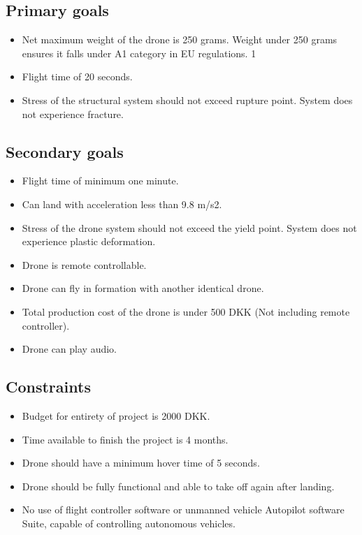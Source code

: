 \documentclass{article}
\begin{document}
\subsection{Primary goals }
\begin{itemize}
    \item 
    Net maximum weight of the drone is 250 grams. Weight under 250 grams ensures it falls under A1 category in EU regulations. 1 
    \item
    Flight time of 20 seconds.
    \item
    Stress of the structural system should not exceed rupture point. System does not experience fracture. 
\end{itemize}


\subsection{Secondary goals}
\begin{itemize}
    \item 
    Flight time of minimum one minute. 
    \item
    Can land with acceleration less than 9.8 m/s2.
    \item
    Stress of the drone system should not exceed the yield point. System does not experience plastic deformation. 
    \item
    Drone is remote controllable. 
    \item
    Drone can fly in formation with another identical drone.
    \item
    Total production cost of the drone is under 500 DKK (Not including remote controller). 
    \item
    Drone can play audio.
\end{itemize}


 
\subsection{Constraints}

\begin{itemize}
    \item 
    Budget for entirety of project is 2000 DKK.  
    \item
    Time available to finish the project is 4 months.
    \item
    Drone should have a minimum hover time of 5 seconds. 
    \item
    Drone should be fully functional and able to take off again after landing.
    \item
    No use of flight controller software or unmanned vehicle Autopilot software Suite, capable of controlling autonomous vehicles. 
\end{itemize}
 
\end{document}
